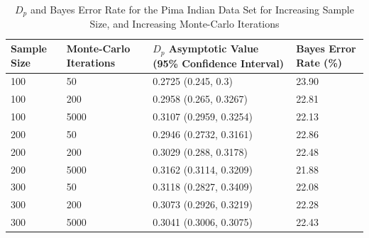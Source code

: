 \documentclass{article}
\begin{document}
		\begin{table}[!h]		
			\caption{$D_p$ and Bayes Error Rate for the Pima Indian Data Set for Increasing Sample Size, and Increasing Monte-Carlo Iterations}
			\begin{center}
				\begin{tabular}[!h]{ |p{2cm}||p{2cm}|p{4cm}|p{3cm}|  }
					
					\hline
					Sample Size & Monte-Carlo Iterations & $D_p$ Asymptotic Value (95\% Confidence Interval)& Bayes Error Rate (\%) \\ [0.5ex] 
					\hline\hline
					100	& 50	& 0.2725   (0.245, 0.3)	& 23.90\\
					
					\hline
					
					100	& 200	& 0.2958  (0.265, 0.3267)	& 22.81 \\
					\hline
					
					100	& 5000	& 0.3107  (0.2959, 0.3254)	& 22.13 \\
					
					\hline
					200	& 50	& 0.2946  (0.2732, 0.3161)	& 22.86 \\
					
					\hline
					200	& 200	& 0.3029  (0.288, 0.3178)	& 22.48 \\
					
					\hline
					200	& 5000  & 0.3162  (0.3114, 0.3209)	& 21.88 \\
					
					\hline
					300	& 50	& 0.3118  (0.2827, 0.3409)  & 22.08 \\
					
					\hline
					300	& 200	& 0.3073  (0.2926, 0.3219)	& 22.28 \\
					\hline
					300	& 5000	& 0.3041  (0.3006, 0.3075)	& 22.43 \\ 
					\hline 		
				\end{tabular}
			\end{center}
		\end{table}			

	\newpage
\end{document}
